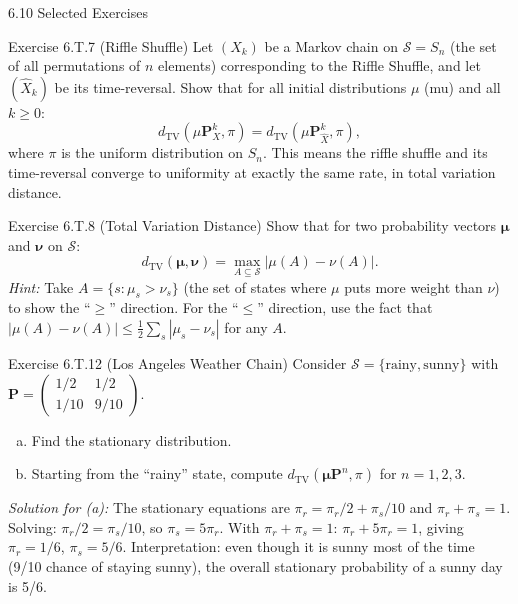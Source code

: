 \documentclass[aspectratio=169,10pt]{beamer}
\newcommand{\dTV}{d_{\mathrm{TV}}}
\newcommand{\bfP}{\mathbf{P}}
\newcommand{\bfmu}{\bm{\mu}}
\newcommand{\bfv}{\bm{\nu}}
\begin{document}
\begin{frame}[allowframebreaks]{6.10 Selected Exercises}

\begin{block}{Exercise 6.T.7 (Riffle Shuffle)}
Let $(X_k)$ be a Markov chain on $\mathcal{S} = S_n$ (the set of all permutations of $n$ elements) corresponding to the Riffle Shuffle, and let $(\hat{X}_k)$ be its time-reversal.
Show that for all initial distributions $\mu$ (mu) and all $k \ge 0$:
\[
  \dTV(\mu \bfP_X^k, \pi) = \dTV(\mu \bfP_{\hat X}^k, \pi),
\]
where $\pi$ is the uniform distribution on $S_n$.
This means the riffle shuffle and its time-reversal converge to uniformity at exactly the same rate, in total variation distance.
\end{block}

\begin{block}{Exercise 6.T.8 (Total Variation Distance)}
Show that for two probability vectors $\bfmu$ and $\bfv$ on $\mathcal{S}$:
\[
  \dTV(\bfmu, \bfv) = \max_{A \subseteq \mathcal{S}}|\mu(A) - \nu(A)|.
\]
\textit{Hint:} Take $A = \{s : \mu_s > \nu_s\}$ (the set of states where $\mu$ puts more weight than $\nu$) to show the ``$\ge$'' direction.
For the ``$\le$'' direction, use the fact that $|\mu(A) - \nu(A)| \le \frac{1}{2}\sum_s |\mu_s - \nu_s|$ for any $A$.
\end{block}

\begin{block}{Exercise 6.T.12 (Los Angeles Weather Chain)}
Consider $\mathcal{S} = \{\text{rainy}, \text{sunny}\}$ with $\bfP = \begin{pmatrix}1/2 & 1/2 \\ 1/10 & 9/10\end{pmatrix}$.
\begin{enumerate}[(a)]
  \item Find the stationary distribution.
  \item Starting from the ``rainy'' state, compute $\dTV(\bfmu \bfP^n, \pi)$ for $n = 1, 2, 3$.
\end{enumerate}
\textit{Solution for (a):} The stationary equations are $\pi_r = \pi_r/2 + \pi_s/10$ and $\pi_r + \pi_s = 1$.
Solving: $\pi_r/2 = \pi_s/10$, so $\pi_s = 5\pi_r$.
With $\pi_r + \pi_s = 1$: $\pi_r + 5\pi_r = 1$, giving $\pi_r = 1/6$, $\pi_s = 5/6$.
Interpretation: even though it is sunny most of the time (9/10 chance of staying sunny), the overall stationary probability of a sunny day is 5/6.
\end{block}

\framebreak


\end{frame}
\end{document}
